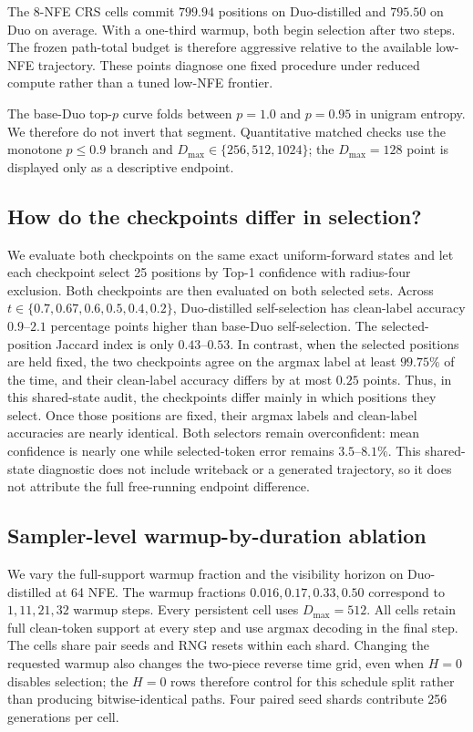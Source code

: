 \documentclass{article}
\newcommand{\1}{\mathbf 1}
\theoremstyle{definition}
\begin{document}
The 8-NFE CRS cells commit $799.94$ positions on Duo-distilled and $795.50$ on
Duo on average. With a one-third warmup, both begin selection after two steps.
The frozen path-total budget is therefore aggressive relative to the available
low-NFE trajectory. These points diagnose one fixed procedure under reduced
compute rather than a tuned low-NFE frontier.

The base-Duo top-$p$ curve folds between $p=1.0$ and $p=0.95$ in unigram
entropy. We therefore do not invert that segment. Quantitative matched checks
use the monotone $p\le0.9$ branch and $D_{\max}\in\{256,512,1024\}$; the
$D_{\max}=128$ point is displayed only as a descriptive endpoint.

\subsection{How do the checkpoints differ in selection?}
\label{app:checkpoint-selector}

We evaluate both checkpoints on the same exact uniform-forward states and let
each checkpoint select 25 positions by Top-1 confidence with radius-four
exclusion. Both checkpoints are then evaluated on both selected sets. Across
$t\in\{0.7,0.67,0.6,0.5,0.4,0.2\}$, Duo-distilled self-selection has clean-label
accuracy $0.9$--$2.1$ percentage points higher than base-Duo self-selection. The selected-position Jaccard index
is only $0.43$--$0.53$. In contrast, when the selected positions are held fixed,
the two checkpoints agree on the argmax label at least $99.75\%$ of the time,
and their clean-label accuracy differs by at most $0.25$ points. Thus, in this
shared-state audit, the checkpoints differ mainly in which positions they
select. Once those positions are fixed, their argmax labels and clean-label
accuracies are nearly identical. Both selectors remain
overconfident: mean confidence is nearly one while selected-token error remains
$3.5$--$8.1\%$. This shared-state diagnostic does not include writeback or a
generated trajectory, so it does not attribute the full free-running endpoint
difference.

\subsection{Sampler-level warmup-by-duration ablation}
\label{app:warmup-duration}

We vary the full-support warmup fraction and the visibility horizon on
Duo-distilled at 64 NFE. The warmup fractions
$0.016,0.17,0.33,0.50$ correspond to $1,11,21,32$ warmup steps. Every
persistent cell uses $D_{\max}=512$. All cells retain full clean-token support
at every step and use argmax decoding in the final step. The cells share pair
seeds and RNG resets within each shard. Changing the requested warmup also
changes the two-piece reverse time grid, even when $H=0$ disables selection;
the $H=0$ rows therefore control for this schedule split rather than producing
bitwise-identical paths. Four paired seed shards contribute 256 generations
per cell.
\end{document}
